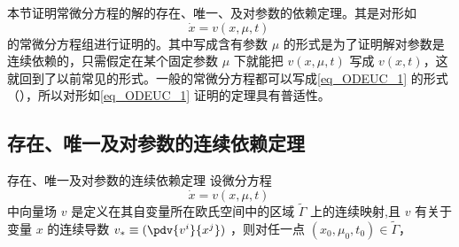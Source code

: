 
本节证明常微分方程的解的存在、唯一、及对参数的依赖定理。其是对形如
\begin{equation}\label{eq_ODEUC_1}
\dot x=v(x,\mu,t)~
\end{equation}
的常微分方程组进行证明的。其中写成含有参数 $\mu$ 的形式是为了证明解对参数是连续依赖的，只需假定在某个固定参数 $\mu$ 下就能把 $v(x,\mu,t)$ 写成 $v(x,t)$，这就回到了以前常见的形式。一般的常微分方程都可以写成\autoref{eq_ODEUC_1} 的形式（），所以对形如\autoref{eq_ODEUC_1} 证明的定理具有普适性。
\subsection{存在、唯一及对参数的连续依赖定理}
\begin{theorem}{存在、唯一及对参数的连续依赖定理}
设微分方程
\begin{equation}
\dot x=v(x,\mu,t)~
\end{equation}
中向量场 $v$ 是定义在其自变量所在欧氏空间中的区域 $\tilde\Gamma$ 上的连续映射,且 $v$ 有关于变量 $x$ 的连续导数 $v_*\equiv(\pdv{v^i}{x^j})$ ，则对任一点 $(x_0,\mu_0,t_0)\in\tilde\Gamma$，
\end{theorem}
